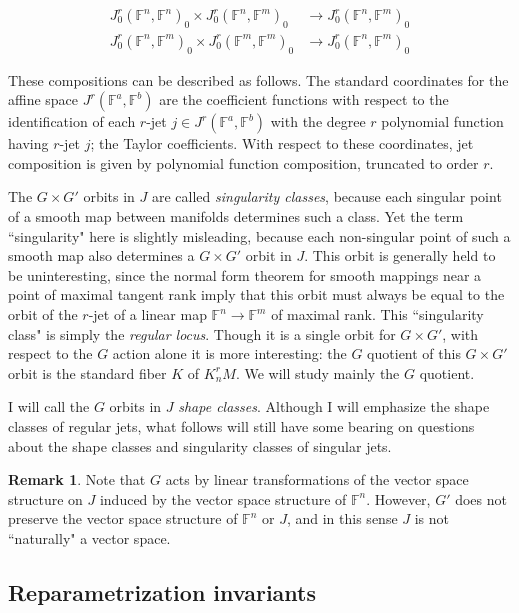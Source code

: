 \documentclass[12pt]{article}
\numberwithin{equation}{section}
\theoremstyle{plain}
\theoremstyle{definition}
\newtheorem{remark}[definition]{Remark}
\newcommand{\ra}{\rightarrow}
\newcommand{\Fb}{\mathbb{F}}
\begin{document}
\begin{align*}
J^{r}_0(\Fb^{n},\Fb^{n})_0 \times J^{r}_0(\Fb^{n},\Fb^{m})_0 &\ra J^{r}_0(\Fb^{n},\Fb^{m})_0\\
J^{r}_0(\Fb^{n},\Fb^{m})_0 \times J^{r}_0(\Fb^{m},\Fb^{m})_0 &\ra J^{r}_0(\Fb^{n},\Fb^{m})_0
\end{align*}

These compositions can be described as follows. The standard coordinates for the affine space $J^{r}(\Fb^{a},\Fb^{b})$ are the coefficient functions with respect to the identification of each $r$-jet $j\in J^{r}(\Fb^{a},\Fb^{b})$ with the degree $r$ polynomial function having $r$-jet $j$; the Taylor coefficients. With respect to these coordinates, jet composition is given by polynomial function composition, truncated to order $r$.

The $G\times G'$ orbits in $J$ are called \emph{singularity classes}, because each singular point of a smooth map between manifolds determines such a class. Yet the term ``singularity" here is slightly misleading, because each non-singular point of such a smooth map also determines a $G\times G'$ orbit in $J$. This orbit is generally held to be uninteresting, since the normal form theorem for smooth mappings near a point of maximal tangent rank imply that this orbit must always be equal to the orbit of the $r$-jet of a linear map $\Fb^{n}\ra \Fb^{m}$ of maximal rank. This ``singularity class" is simply the \emph{regular locus}. Though it is a single orbit for $G\times G'$, with respect to the $G$ action alone it is more interesting: the $G$ quotient of this $G\times G'$ orbit is the standard fiber $K$ of $K^{r}_{n}M$. We will study mainly the $G$ quotient.

I will call the $G$ orbits in $J$ \emph{shape classes}. Although I will emphasize the shape classes of regular jets, what follows will still have some bearing on questions about the shape classes and singularity classes of singular jets.

\begin{remark} Note that $G$ acts by linear transformations of the vector space structure on $J$ induced by the vector space structure of $\Fb^{n}$. However, $G'$ does not preserve the vector space structure of $\Fb^{n}$ or $J$, and in this sense $J$ is not ``naturally" a vector space.
\end{remark}

\subsection{Reparametrization invariants}
\end{document}
